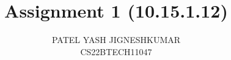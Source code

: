 \documentclass[journal,12pt,twocolumn]{IEEEtran}
\begin{document}
\let\vec\mathbf




\vspace{3cm}

\title{
Assignment 1 (10.15.1.12)
}
\author{ 
PATEL YASH JIGNESHKUMAR \\
CS22BTECH11047

	
}	


%
%
%

% 
%
\end{document}
